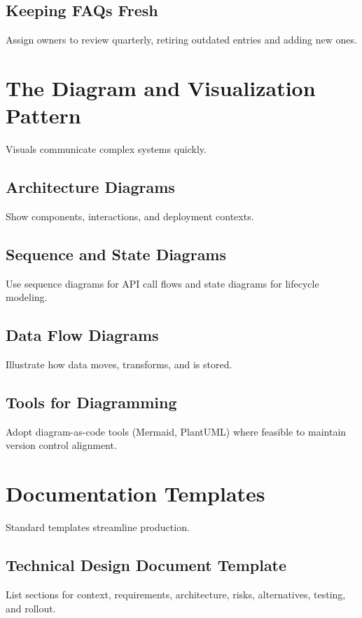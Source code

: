 \subsection{Keeping FAQs Fresh}
Assign owners to review quarterly, retiring outdated entries and adding new ones.

\section{The Diagram and Visualization Pattern}
\label{sec:diagrams}

Visuals communicate complex systems quickly.

\subsection{Architecture Diagrams}
Show components, interactions, and deployment contexts.

\subsection{Sequence and State Diagrams}
Use sequence diagrams for API call flows and state diagrams for lifecycle modeling.

\subsection{Data Flow Diagrams}
Illustrate how data moves, transforms, and is stored.

\subsection{Tools for Diagramming}
Adopt diagram-as-code tools (Mermaid, PlantUML) where feasible to maintain version control alignment.

\section{Documentation Templates}
\label{sec:doc-templates}

Standard templates streamline production.

\subsection{Technical Design Document Template}
List sections for context, requirements, architecture, risks, alternatives, testing, and rollout.


